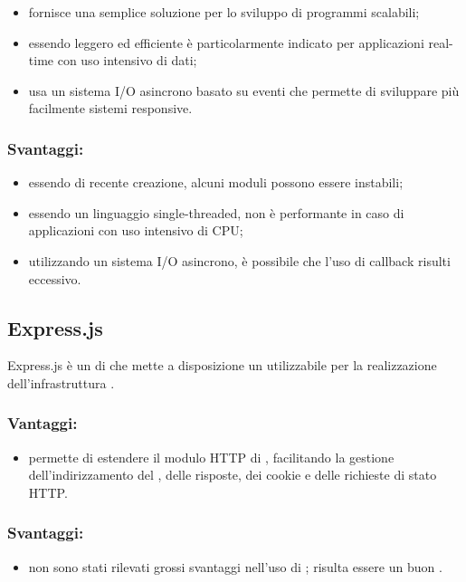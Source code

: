 \documentclass[a4paper, titlepage]{article}
\begin{document}
\begin{itemize}
	\item fornisce una semplice soluzione per lo sviluppo di programmi scalabili;
	\item essendo leggero ed efficiente è particolarmente indicato per applicazioni real-time con uso intensivo di dati;
	\item usa un sistema I/O asincrono basato su eventi che permette di sviluppare più facilmente sistemi responsive.
\end{itemize}

\subsubsection{Svantaggi:}

\begin{itemize}
	\item essendo di recente creazione, alcuni moduli possono essere instabili;
	\item essendo un linguaggio single-threaded, non è performante in caso di applicazioni con uso
	intensivo di CPU;
	\item utilizzando un sistema I/O asincrono, è possibile che l’uso di callback risulti eccessivo.
\end{itemize}

\subsection{Express.js}
Express.js è un  di  che mette a disposizione un  utilizzabile per la realizzazione dell’infrastruttura .

\subsubsection{Vantaggi:}

\begin{itemize}
	\item permette di estendere il modulo HTTP di , facilitando la gestione dell’indirizzamento del , delle risposte, dei cookie e delle richieste di stato HTTP.
\end{itemize}

\subsubsection{Svantaggi:}

\begin{itemize}
	\item non sono stati rilevati grossi svantaggi nell'uso di ; risulta essere un buon .
\end{itemize}
\end{document}
